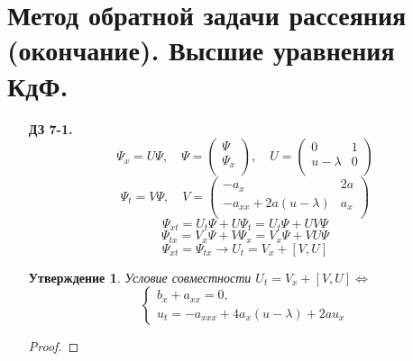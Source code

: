 \documentclass[12pt]{article}
\newtheorem{utv}{Утверждение}
\theoremstyle{definition}
\begin{document}
\section{Метод обратной задачи рассеяния (окончание). Высшие уравнения КдФ.}
\begin{itemize}
    \item[\textbf{ДЗ 7-1.}] 
    \begin{equation}
        \Psi_x=U\Psi,\quad \Psi=\left(
            \begin{array}{c}
             \Psi\\
             \Psi_x\\
        \end{array}
        \right),\quad U=\left(
            \begin{array}{cc}
             0 & 1\\
             u-\lambda & 0\\
        \end{array}
        \right)
    \end{equation}
    \begin{equation}
        \Psi_t=V\Psi,\quad V=\left(
            \begin{array}{cc}
             -a_x & 2a\\
             -a_{xx}+2a(u-\lambda) & a_x\\
        \end{array}
        \right)
    \end{equation}
    \begin{equation}
        \Psi_{xt}=U_t\Psi+U\Psi_t=U_t\Psi+UV\Psi
    \end{equation}
    \begin{equation}
        \Psi_{tx}=V_x\Psi+V\Psi_x=V_x\Psi+VU\Psi
    \end{equation}
    \begin{equation}
        \Psi_{xt}=\Psi_{tx}\rightarrow U_t=V_x+[V,U]
    \end{equation}
    \begin{utv}
    Условие совместности $U_t=V_x+[V,U] \Leftrightarrow$
    \begin{equation}
        \left\{
        \begin{array}{l}
        b_x+a_{xx}=0,\\
        u_t=-a_{xxx}+4a_x(u-\lambda)+2au_x
        \end{array}
        \right.
    \end{equation}
    \end{utv}
    \begin{proof}

\end{proof}
\end{itemize}
\end{document}
